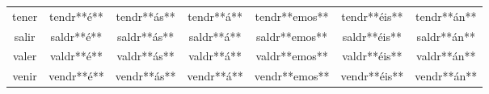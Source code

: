 \begin{tabular}{ccccccc}
tener       & tendr**é**     & tendr**ás**     & tendr**á**          & tendr**emos**      & tendr**éis**       & tendr**án**               \\
salir       & saldr**é**     & saldr**ás**     & saldr**á**          & saldr**emos**      & saldr**éis**       & saldr**án**               \\
valer       & valdr**é**     & valdr**ás**     & valdr**á**          & valdr**emos**      & valdr**éis**       & valdr**án**               \\
venir       & vendr**é**     & vendr**ás**     & vendr**á**          & vendr**emos**      & vendr**éis**       & vendr**án**               \\
\bottomrule
\end{tabular}


